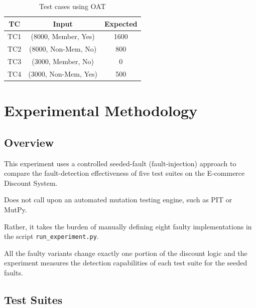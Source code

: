\documentclass[conference]{IEEEtran}
\begin{document}
\begin{table}[!t]

\centering

\caption{Test cases using OAT}

\label{tab:oat_tc}

\begin{tabular}{|c|c|c|}
\hline
\textbf{TC} & \textbf{Input} & \textbf{Expected} \\
\hline
TC1 & (8000, Member, Yes) & 1600 \\
TC2 & (8000, Non-Mem, No) & 800 \\
TC3 & (3000, Member, No) & 0 \\
TC4 & (3000, Non-Mem, Yes) & 500 \\
\hline
\end{tabular}

\end{table}






\section{Experimental Methodology}

\label{sec:methodology}



\subsection{Overview}

This experiment uses a controlled seeded-fault (fault-injection) approach to compare the fault-detection effectiveness of five test suites on the E-commerce Discount System.

Does not call upon an automated mutation testing engine, such as PIT or MutPy.

Rather, it takes the burden of manually defining eight faulty implementations in the script \texttt{run\_experiment.py}.


All the faulty variants change exactly one portion of the discount logic and the experiment measures the detection capabilities of each test suite for the seeded faults.



\subsection{Test Suites}
\end{document}
